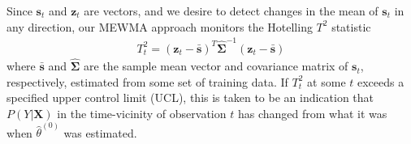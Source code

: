 \documentclass[twoside,11pt]{article}
\begin{document}
Since $\bm{s}_t$ and $\bm{z}_t$ are vectors, and we desire to detect changes in the mean of $\bm{s}_t$ in any direction, our MEWMA approach monitors the Hotelling $T^2$ statistic 
\begin{align}
T_t^2 = (\bm {z}_t-\bar { \bm {s}})^T \hat {\bm { \Sigma}} ^{-1}(\bm {z}_t-\bar { \bm {s}})
\label{eqn:hotellingt2}
\end{align}
where $\bar {\bm{s}}$ and $\hat {\bm {\Sigma}}$ are the sample mean vector and covariance matrix of $\bm {s}_t$, respectively, estimated from some set of training data. If $T_t^2$ at some $t$ exceeds a specified upper control limit (UCL), this is taken to be an indication that $P(Y|\bm{X})$ in the time-vicinity of observation $t$ has changed from what it was when $\hat{\theta}^{(0)}$ was estimated.

\end{document}
